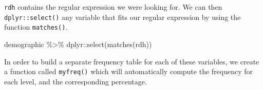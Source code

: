 \documentclass[
]{book}
\newenvironment{Shaded}{\begin{snugshade}}{\end{snugshade}}
\newcommand{\AttributeTok}[1]{\textcolor[rgb]{0.77,0.63,0.00}{#1}}
\newcommand{\ControlFlowTok}[1]{\textcolor[rgb]{0.13,0.29,0.53}{\textbf{#1}}}
\newcommand{\FunctionTok}[1]{\textcolor[rgb]{0.00,0.00,0.00}{#1}}
\newcommand{\NormalTok}[1]{#1}
\newcommand{\OtherTok}[1]{\textcolor[rgb]{0.56,0.35,0.01}{#1}}
\newcommand{\SpecialCharTok}[1]{\textcolor[rgb]{0.00,0.00,0.00}{#1}}
\begin{document}
\texttt{rdh} contains the regular expression we were looking for. We can then \texttt{dplyr::select()} any variable that fits our regular expression by using the function \texttt{matches()}.

\begin{Shaded}
\begin{Highlighting}[]
\NormalTok{demographic }\SpecialCharTok{\%\textgreater{}\%} 
\NormalTok{  dplyr}\SpecialCharTok{::}\FunctionTok{select}\NormalTok{(}\FunctionTok{matches}\NormalTok{(rdh))}
\end{Highlighting}
\end{Shaded}

In order to build a separate frequency table for each of these variables, we create a function called \texttt{myfreq()} which will automatically compute the frequency for each level, and the corresponding percentage.

\begin{Shaded}
\end{Shaded}
\end{document}
